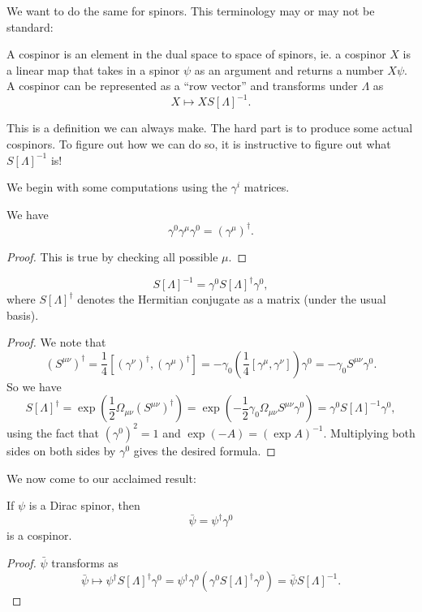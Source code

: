 \documentclass[a4paper]{article}
\begin{document}
We want to do the same for spinors. This terminology may or may not be standard:
\begin{defi}[Cospinor]
  A cospinor is an element in the dual space to space of spinors, ie. a cospinor $X$ is a linear map that takes in a spinor $\psi$ as an argument and returns a number $X\psi$. A cospinor can be represented as a ``row vector'' and transforms under $\Lambda$ as
  \[
    X \mapsto X S[\Lambda]^{-1}.
  \]
\end{defi}
This is a definition we can always make. The hard part is to produce some actual cospinors. To figure out how we can do so, it is instructive to figure out what $S[\Lambda]^{-1}$ is!

We begin with some computations using the $\gamma^i$ matrices.
\begin{prop}
  We have
  \[
    \gamma^0 \gamma^\mu \gamma^0 = (\gamma^\mu)^\dagger.
  \]
\end{prop}

\begin{proof}
  This is true by checking all possible $\mu$.
\end{proof}

\begin{prop}
  \[
    S[\Lambda]^{-1} = \gamma^0 S[\Lambda]^\dagger \gamma^0,
  \]
  where $S[\Lambda]^\dagger$ denotes the Hermitian conjugate as a matrix (under the usual basis).
\end{prop}

\begin{proof}
  We note that
  \[
    (S^{\mu\nu})^\dagger = \frac{1}{4}[(\gamma^\nu)^\dagger, (\gamma^\mu)^\dagger] = -\gamma_0 \left(\frac{1}{4}[\gamma^\mu, \gamma^\nu]\right) \gamma^0 = - \gamma_0 S^{\mu\nu} \gamma^0.
  \]
  So we have
  \[
    S[\Lambda]^\dagger = \exp\left(\frac{1}{2} \Omega_{\mu\nu}(S^{\mu\nu})^\dagger\right) = \exp\left(-\frac{1}{2} \gamma_0 \Omega_{\mu\nu}S^{\mu\nu}\gamma^0\right) = \gamma^0 S[\Lambda]^{-1} \gamma^0,
  \]
  using the fact that $(\gamma^0)^2 = 1$ and $\exp(-A) = (\exp A)^{-1}$. Multiplying both sides on both sides by $\gamma^0$ gives the desired formula.
\end{proof}

We now come to our acclaimed result:
\begin{prop}
  If $\psi$ is a Dirac spinor, then
  \[
    \bar\psi = \psi^\dagger \gamma^0
  \]
  is a cospinor.
\end{prop}

\begin{proof}
  $\bar \psi$ transforms as
  \[
    \bar \psi \mapsto \psi^\dagger S[\Lambda]^\dagger \gamma^0 = \psi^\dagger \gamma^0 (\gamma^0 S[\Lambda]^\dagger \gamma^0) = \bar\psi S[\Lambda]^{-1}.
  \]
\end{proof}
\end{document}
